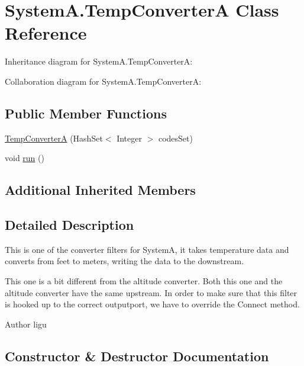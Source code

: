 \hypertarget{class_system_a_1_1_temp_converter_a}{}\section{System\+A.\+Temp\+Converter\+A Class Reference}
\label{class_system_a_1_1_temp_converter_a}


Inheritance diagram for System\+A.\+Temp\+Converter\+A\+:


Collaboration diagram for System\+A.\+Temp\+Converter\+A\+:
\subsection*{Public Member Functions}
\begin{DoxyCompactItemize}
\item 
\hyperlink{class_system_a_1_1_temp_converter_a_a7db095a2db61839462d24eb08c00679a}{Temp\+Converter\+A} (Hash\+Set$<$ Integer $>$ codes\+Set)
\item 
void \hyperlink{class_system_a_1_1_temp_converter_a_a12be4f2452c1138c98500526f0d151a4}{run} ()
\end{DoxyCompactItemize}
\subsection*{Additional Inherited Members}


\subsection{Detailed Description}
This is one of the converter filters for System\+A, it takes temperature data and converts from feet to meters, writing the data to the downstream.

This one is a bit different from the altitude converter. Both this one and the altitude converter have the same upstream. In order to make sure that this filter is hooked up to the correct outputport, we have to override the Connect method. \begin{DoxyAuthor}{Author}
ligu 
\end{DoxyAuthor}


\subsection{Constructor \& Destructor Documentation}
\hypertarget{class_system_a_1_1_temp_converter_a_a7db095a2db61839462d24eb08c00679a}{}
